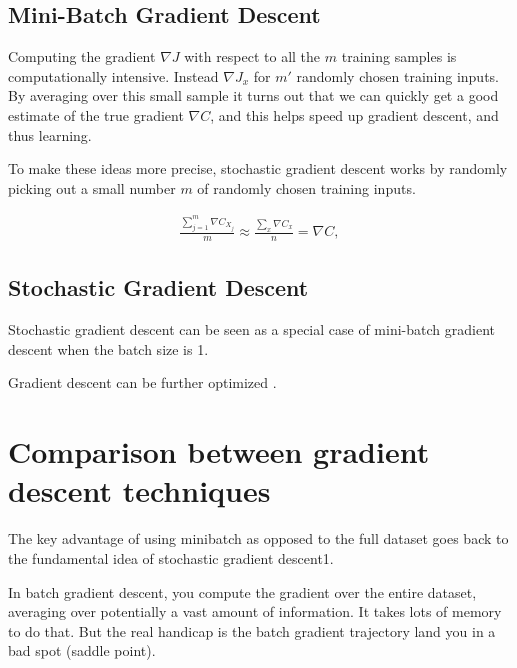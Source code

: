 \subsection{Mini-Batch Gradient Descent}

Computing the gradient $\nabla J$ with respect to all the $m$ training samples is computationally intensive. Instead $\nabla J_x$ for $m'$ randomly chosen training inputs. By averaging over this small sample it turns out that we can quickly get a good estimate of the true gradient $\nabla C$, and this helps speed up gradient descent, and thus learning.

To make these ideas more precise, stochastic gradient descent works by randomly picking out a small number $m$ of randomly chosen training inputs. 

\begin{eqnarray}
  \frac{\sum_{j=1}^m \nabla C_{X_{j}}}{m} \approx \frac{\sum_x \nabla C_x}{n} = \nabla C,
\end{eqnarray}


\subsection{Stochastic Gradient Descent}

Stochastic gradient descent can be seen as a special case of mini-batch gradient descent when the batch size is 1.




Gradient descent can be further optimized \cite{ruder2016}.

\section{Comparison between gradient descent techniques}


The key advantage of using minibatch as opposed to the full dataset goes back to the fundamental idea of stochastic gradient descent1.

In batch gradient descent, you compute the gradient over the entire dataset, averaging over potentially a vast amount of information. It takes lots of memory to do that. But the real handicap is the batch gradient trajectory land you in a bad spot (saddle point).

